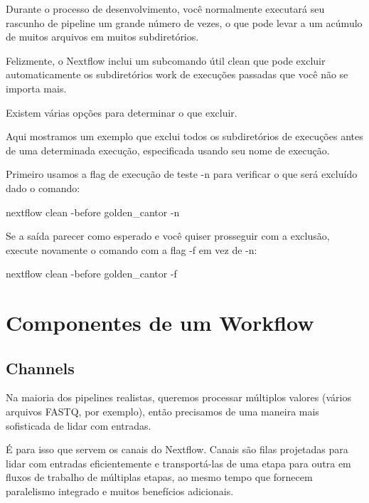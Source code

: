 \documentclass[
  brazilian,
  letterpaper,
  DIV=11,
  numbers=noendperiod]{scrreprt}
\newenvironment{Shaded}{\begin{snugshade}}{\end{snugshade}}
\newcommand{\AttributeTok}[1]{\textcolor[rgb]{0.40,0.45,0.13}{#1}}
\newcommand{\ExtensionTok}[1]{\textcolor[rgb]{0.00,0.23,0.31}{#1}}
\newcommand{\NormalTok}[1]{\textcolor[rgb]{0.00,0.23,0.31}{#1}}
\begin{document}
Durante o processo de desenvolvimento, você normalmente executará seu
rascunho de pipeline um grande número de vezes, o que pode levar a um
acúmulo de muitos arquivos em muitos subdiretórios.

Felizmente, o Nextflow inclui um subcomando útil clean que pode excluir
automaticamente os subdiretórios work de execuções passadas que você não
se importa mais.

Existem várias opções para determinar o que excluir.

Aqui mostramos um exemplo que exclui todos os subdiretórios de execuções
antes de uma determinada execução, especificada usando seu nome de
execução.

Primeiro usamos a flag de execução de teste -n para verificar o que será
excluído dado o comando:

\begin{Shaded}
\begin{Highlighting}[]
\ExtensionTok{nextflow}\NormalTok{ clean }\AttributeTok{{-}before}\NormalTok{ golden\_cantor }\AttributeTok{{-}n}
\end{Highlighting}
\end{Shaded}

Se a saída parecer como esperado e você quiser prosseguir com a
exclusão, execute novamente o comando com a flag -f em vez de -n:

\begin{Shaded}
\begin{Highlighting}[]
\ExtensionTok{nextflow}\NormalTok{ clean }\AttributeTok{{-}before}\NormalTok{ golden\_cantor }\AttributeTok{{-}f}
\end{Highlighting}
\end{Shaded}

\chapter{Componentes de um Workflow}\label{componentes-de-um-workflow}

\section{Channels}\label{channels}

Na maioria dos pipelines realistas, queremos processar múltiplos valores
(vários arquivos FASTQ, por exemplo), então precisamos de uma maneira
mais sofisticada de lidar com entradas.

É para isso que servem os canais do Nextflow. Canais são filas
projetadas para lidar com entradas eficientemente e transportá-las de
uma etapa para outra em fluxos de trabalho de múltiplas etapas, ao mesmo
tempo que fornecem paralelismo integrado e muitos benefícios adicionais.
\end{document}
